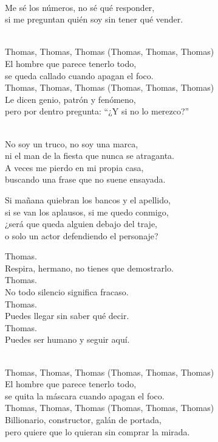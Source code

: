 \begin{lyrics}
\\
Me sé los números, no sé qué responder,\\
si me preguntan quién soy sin tener qué vender.

\\
Thomas, Thomas, Thomas
(Thomas, Thomas, Thomas)\\
El hombre que parece tenerlo todo,\\
se queda callado cuando apagan el foco.\\
Thomas, Thomas, Thomas
(Thomas, Thomas, Thomas)\\
Le dicen genio, patrón y fenómeno,\\
pero por dentro pregunta: “¿Y si no lo merezco?”

\\
No soy un truco, no soy una marca,\\
ni el man de la fiesta que nunca se atraganta.\\
A veces me pierdo en mi propia casa,\\
buscando una frase que no suene ensayada.

Si mañana quiebran los bancos y el apellido,\\
si se van los aplausos, si me quedo conmigo,\\
¿será que queda alguien debajo del traje,\\
o solo un actor defendiendo el personaje?

Thomas.\\
Respira, hermano, no tienes que demostrarlo.\\
Thomas.\\
No todo silencio significa fracaso.\\
Thomas.\\
Puedes llegar sin saber qué decir.\\
Thomas.\\
Puedes ser humano y seguir aquí.

\\
Thomas, Thomas, Thomas
(Thomas, Thomas, Thomas)\\
El hombre que parece tenerlo todo,\\
se quita la máscara cuando apagan el foco.\\
Thomas, Thomas, Thomas
(Thomas, Thomas, Thomas)\\
Billionario, constructor, galán de portada,\\
pero quiere que lo quieran sin comprar la mirada.


\end{lyrics}
